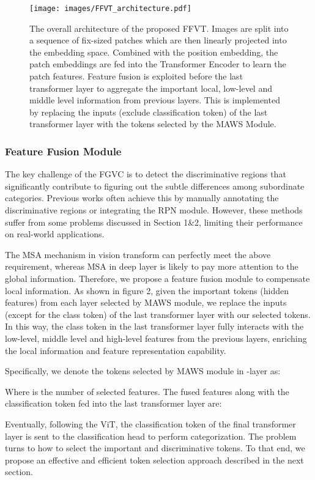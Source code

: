 \documentclass{bmvc2k}
\begin{document}
\begin{figure*}[ht]   
    \centering 
    \texttt{[image: images/FFVT\_architecture.pdf]} 
    \caption{The overall architecture of the proposed FFVT. Images are split into a sequence of fix-sized patches which are then linearly projected into the embedding space. Combined with the position embedding, the patch embeddings are fed into the Transformer Encoder to learn the patch features. Feature fusion is exploited before the last transformer layer to aggregate the important local, low-level and middle level information from previous layers. This is implemented by replacing the inputs (exclude classification token) of the last transformer layer with the tokens selected by the MAWS Module. }    
    \label{fig_overall_architecture}  
\end{figure*}

\subsubsection{Feature Fusion Module}
The key challenge of the FGVC is to detect the discriminative regions that significantly contribute to figuring out the subtle differences among subordinate categories. Previous works often achieve this by manually annotating the discriminative regions or integrating the RPN module. However, these methods suffer from some problems discussed in Section 1\&2, limiting their performance on real-world applications.
\par
The MSA mechanism in vision transform can perfectly meet the above requirement, whereas MSA in deep layer is likely to pay more attention to the global information. Therefore, we propose a feature fusion module to compensate local information. As shown in figure 2, given the important tokens (hidden features) from each layer selected by MAWS module, we replace the inputs (except for the class token) of the last transformer layer with our selected tokens. In this way, the class token in the last transformer layer fully interacts with the low-level, middle level and high-level features from the previous layers, enriching the local information and feature representation capability. 
\par
Specifically, we denote the tokens selected by MAWS module in -layer as:

Where  is the number of selected features. The fused features along with the classification token fed into the last transformer layer  are:

\par
Eventually, following the ViT, the classification token of the final transformer layer is sent to the classification head to perform categorization. The problem turns to how to select the important and discriminative tokens. To that end, we propose an effective and efficient token selection approach described in the next section.
\end{document}
